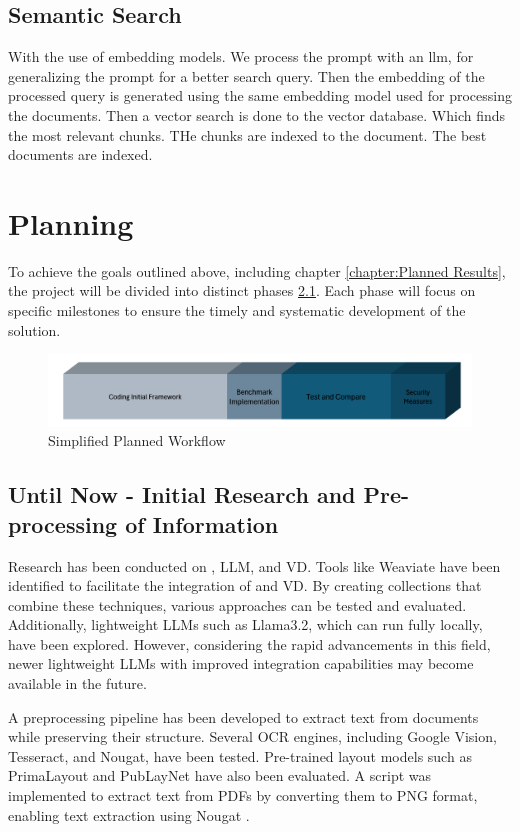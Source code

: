 \section{Semantic Search}
With the use of embedding models. We process the prompt with an llm, for generalizing the prompt for a better search query. Then the embedding of the processed query is generated using the same embedding model used for processing the documents. Then a vector search is done to the vector database. Which finds the most relevant chunks. THe chunks are indexed to the document. The best documents are indexed.
\chapter{Planning}

To achieve the goals outlined above, including chapter \ref{chapter:Planned Results}, the project will be divided into distinct phases \ref{fig:planning}. Each phase will focus on specific milestones to ensure the timely and systematic development of the solution.

\begin{figure}[H]
    \centering
    \includegraphics[width=1\linewidth]{Images/planning.png}
    \caption{Simplified Planned Workflow}
    \label{fig:planning}
\end{figure}
\section{Until Now - Initial Research and Pre-processing of Information}
Research has been conducted on , \ac{LLM}, and \ac{VD}. Tools like Weaviate have been identified to facilitate the integration of  and \ac{VD}. By creating collections that combine these techniques, various approaches can be tested and evaluated. Additionally, lightweight \ac{LLM}s such as Llama3.2, which can run fully locally, have been explored. However, considering the rapid advancements in this field, newer lightweight \ac{LLM}s with improved integration capabilities may become available in the future.

A preprocessing pipeline has been developed to extract text from documents while preserving their structure. Several OCR engines, including Google Vision, Tesseract, and Nougat, have been tested. Pre-trained layout models such as PrimaLayout and PubLayNet have also been evaluated. A script was implemented to extract text from PDFs by converting them to PNG format, enabling text extraction using Nougat \cite{blecher2023nougatneuralopticalunderstanding}.

